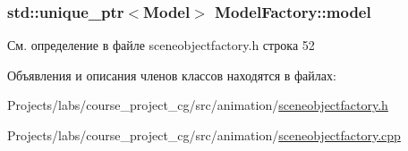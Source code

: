 \subsubsection[{\texorpdfstring{model}{model}}]{\setlength{\rightskip}{0pt plus 5cm}std\+::unique\+\_\+ptr$<${\bf Model}$>$ Model\+Factory\+::model\hspace{0.3cm}{\ttfamily [private]}}\hypertarget{class_model_factory_a145458dc259da4dd2236acb519e998af}{}\label{class_model_factory_a145458dc259da4dd2236acb519e998af}


См. определение в файле sceneobjectfactory.\+h строка 52



Объявления и описания членов классов находятся в файлах\+:\begin{DoxyCompactItemize}
\item 
Projects/labs/course\+\_\+project\+\_\+cg/src/animation/\hyperlink{sceneobjectfactory_8h}{sceneobjectfactory.\+h}\item 
Projects/labs/course\+\_\+project\+\_\+cg/src/animation/\hyperlink{sceneobjectfactory_8cpp}{sceneobjectfactory.\+cpp}\end{DoxyCompactItemize}
